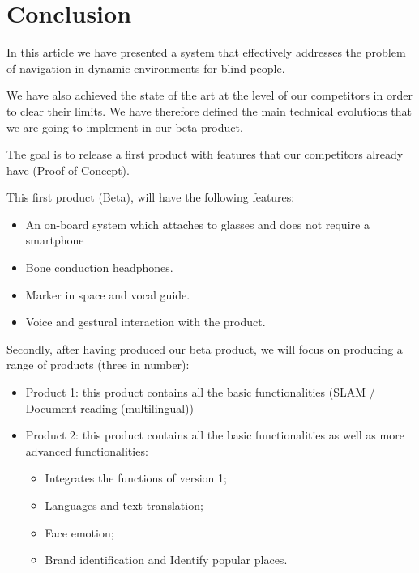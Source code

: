 \documentclass[conference,compsoc]{IEEEtran}
\begin{document}
\section{Conclusion}

In this article we have presented a system that effectively addresses the problem of navigation in dynamic environments for blind people.

We have also achieved the state of the art at the level of our competitors in order to clear their limits.
We have therefore defined the main technical evolutions that we are going to implement in our beta product.

The goal is to release a first product with features that our competitors already have (Proof of Concept).

This first product (Beta), will have the following features:
\begin{itemize}
\item An on-board system which attaches to glasses and does not require a smartphone
\item Bone conduction headphones.
\item Marker in space and vocal guide.
\item Voice and gestural interaction with the product.
\end{itemize}

Secondly, after having produced our beta product, we will focus on producing a range of products (three in number):
\begin{itemize}
\item Product 1: this product contains all the basic functionalities (SLAM / Document reading (multilingual))
\item Product 2: this product contains all the basic functionalities as well as more advanced functionalities:
\begin{itemize}
    \item Integrates the functions of version 1;
    \item Languages and text translation;
    \item Face emotion;
    \item Brand identification and Identify popular places.
    \end{itemize}
\end{itemize}





\end{document}
